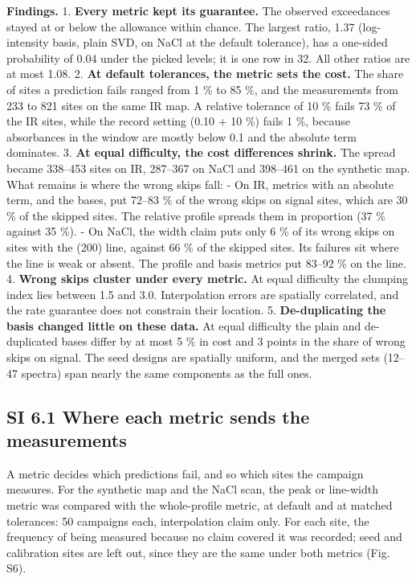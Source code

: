 \documentclass{iopjournal}
\begin{document}
\textbf{Findings.} 1. \textbf{Every metric kept its guarantee.} The observed exceedances stayed at or below the allowance within chance. The largest ratio, 1.37 (log-intensity basis, plain SVD, on NaCl at the default tolerance), has a one-sided probability of 0.04 under the picked levels; it is one row in 32. All other ratios are at most 1.08. 2. \textbf{At default tolerances, the metric sets the cost.} The share of sites a prediction fails ranged from 1 \% to 85 \%, and the measurements from 233 to 821 sites on the same IR map. A relative tolerance of 10 \% fails 73 \% of the IR sites, while the record setting (0.10 + 10 \%) fails 1 \%, because absorbances in the window are mostly below 0.1 and the absolute term dominates. 3. \textbf{At equal difficulty, the cost differences shrink.} The spread became 338--453 sites on IR, 287--367 on NaCl and 398--461 on the synthetic map. What remains is where the wrong skips fall: - On IR, metrics with an absolute term, and the bases, put 72--83 \% of the wrong skips on signal sites, which are 30 \% of the skipped sites. The relative profile spreads them in proportion (37 \% against 35 \%). - On NaCl, the width claim puts only 6 \% of its wrong skips on sites with the (200) line, against 66 \% of the skipped sites. Its failures sit where the line is weak or absent. The profile and basis metrics put 83--92 \% on the line. 4. \textbf{Wrong skips cluster under every metric.} At equal difficulty the clumping index lies between 1.5 and 3.0. Interpolation errors are spatially correlated, and the rate guarantee does not constrain their location. 5. \textbf{De-duplicating the basis changed little on these data.} At equal difficulty the plain and de-duplicated bases differ by at most 5 \% in cost and 3 points in the share of wrong skips on signal. The seed designs are spatially uniform, and the merged sets (12--47 spectra) span nearly the same components as the full ones.

\hypertarget{si-6.1-where-each-metric-sends-the-measurements}{%
\subsection*{SI 6.1 Where each metric sends the measurements}\label{si-6.1-where-each-metric-sends-the-measurements}}

A metric decides which predictions fail, and so which sites the campaign measures. For the synthetic map and the NaCl scan, the peak or line-width metric was compared with the whole-profile metric, at default and at matched tolerances: 50 campaigns each, interpolation claim only. For each site, the frequency of being measured because no claim covered it was recorded; seed and calibration sites are left out, since they are the same under both metrics (Fig. S6).
\end{document}
